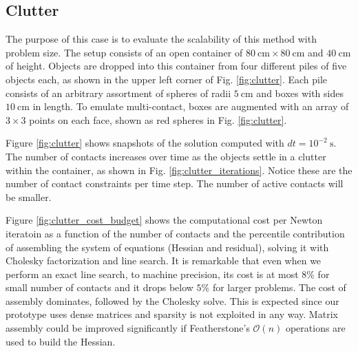 \subsection{Clutter}
\label{sec:clutter}

The purpose of this case is to evaluate the scalability of this method with
problem size. The setup consists of an open container of
$80~\text{cm}\times80~\text{cm}$ and $40~\text{cm}$ of height. Objects are
dropped into this container from four different piles of five objects each, as
shown in the upper left corner of Fig. \ref{fig:clutter}. Each pile consists of
an arbitrary assortment of spheres of radii $5~\text{cm}$ and boxes with sides
$10~\text{cm}$ in length. To emulate multi-contact, boxes are augmented with an
array of $3\times 3$ points on each face, shown as red spheres in Fig.
\ref{fig:clutter}.

Figure \ref{fig:clutter} shows snapshots of the solution computed with
$dt=10^{-2}~\text{s}$. The number of contacts increases over time as the objects
settle in a clutter within the container, as shown in Fig.
\ref{fig:clutter_iterations}. Notice these are the number of contact constraints
per time step. The number of active contacts will be smaller.

Figure \ref{fig:clutter_cost_budget} shows the computational cost per Newton
iteratoin as a function of the number of contacts and the percentile
contribution of assembling the system of equations (Hessian and residual),
solving it with Cholesky factorization and line search. It is remarkable that
even when we perform an exact line search, to machine precision, its cost is at
most $8\%$ for small number of contacts and it drops below $5\%$ for larger
problems. The cost of assembly dominates, followed by the Cholesky solve. This
is expected since our prototype uses dense matrices and sparsity is not
exploited in any way. Matrix assembly could be improved significantly if
Featherstone's $\mathcal{O}(n)$ operations are used to build the Hessian.


